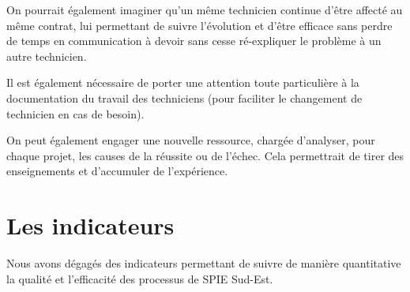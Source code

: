On pourrait également imaginer qu'un même technicien continue d'être affecté au même contrat, lui permettant de suivre l'évolution et d'être efficace sans perdre de temps en communication à devoir sans cesse ré-expliquer le problème à un autre technicien.

Il est également nécessaire de porter une attention toute particulière à la documentation du travail des techniciens (pour faciliter le changement de technicien en cas de besoin).

On peut également engager une nouvelle ressource, chargée d'analyser, pour chaque projet, les causes de la réussite ou de l'échec. Cela permettrait de tirer des enseignements et d'accumuler de l'expérience.

\section{Les indicateurs}

    Nous avons dégagés des indicateurs permettant de suivre de manière quantitative la qualité et l'efficacité des processus de SPIE Sud-Est.

